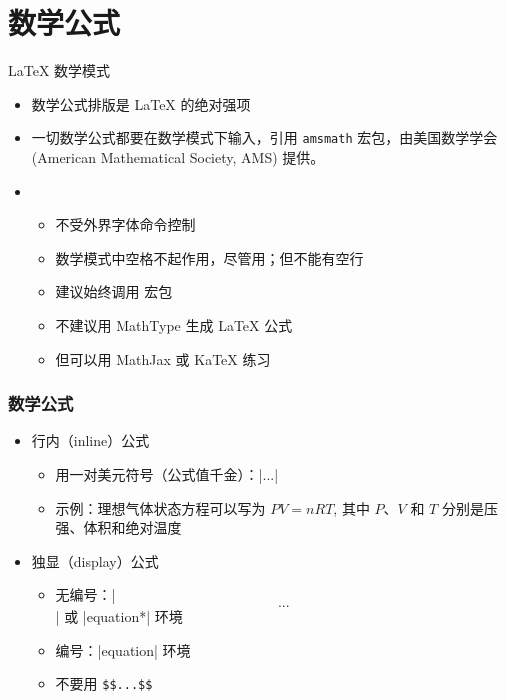 \section{数学公式}

\begin{frame}[fragile]{\LaTeX{} 数学模式}
    \begin{itemize}
    \item 数学公式排版是 \LaTeX{} 的绝对强项
    \item 一切数学公式都要在数学模式下输入，引用 \texttt{amsmath} 宏包，由美国数学学会(American Mathematical Society, AMS) 提供。
    \pause
    
    \item 
        \begin{itemize}
          \item 不受外界字体命令控制
          \item 数学模式中空格不起作用，尽管用；但不能有空行
          \item 建议始终调用  宏包 \pause
          \item \alert{不建议用 MathType 生成 \LaTeX{} 公式}
          \item 但可以用 MathJax  或 KaTeX  练习
        \end{itemize}
    \end{itemize}
\end{frame}

\begin{frame}[fragile]
\frametitle{数学公式}
\begin{itemize}

  \item 行内（inline）公式

    \begin{itemize}
      \item 用一对美元符号（公式值千金）：|$...$|
      \item 示例：理想气体状态方程可以写为 $PV=nRT$, 其中 $P$、$V$ 和 $T$
        分别是压强、体积和绝对温度
    \end{itemize} \pause

  \item 独显（display）公式

    \begin{itemize}
      \item 无编号：|\[...\]| 或 |equation*| 环境
      \item 编号：|equation| 环境
      \item \alert{不要用 \texttt{\$\$...\$\$}}
    \end{itemize}
\end{itemize}
\end{frame}

